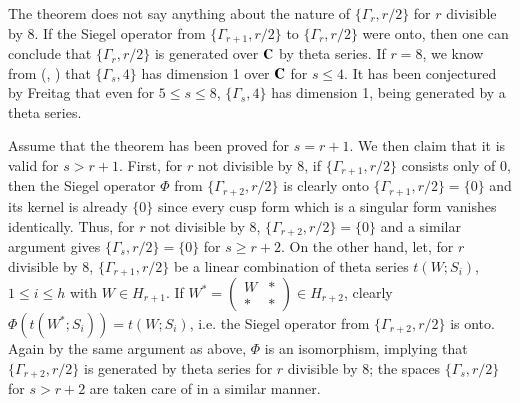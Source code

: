 \begin{remark*}
The theorem does not say anything about the nature of
$\{\Gamma_{r},r/2\}$ for $r$ divisible by $8$. If the Siegel operator
from $\{\Gamma_{r+1},r/2\}$ to $\{\Gamma_{r},r/2\}$ were onto, then
one can conclude that $\{\Gamma_{r},r/2\}$ is generated over $\mathbf{C}$ by
theta series. If $r=8$, we know from
(\cite{art02-key1}, \cite{art02-key2}) that $\{\Gamma_{s},4\}$ has
dimension 1 over $\mathbf{C}$ for $s\leq 4$. It has been conjectured by
Freitag that even for $5\leq s\leq 8$, $\{\Gamma_{s},4\}$ has
dimension 1, being generated by a theta series.
\end{remark*}

Assume that the theorem has been proved for $s=r+1$. We then claim
that it is valid for $s>r+1$. First, for $r$ not divisible by 8, if
$\{\Gamma_{r+1},r/2\}$ consists only of 0, then the Siegel operator
$\Phi$ from $\{\Gamma_{r+2},r/2\}$ is clearly onto
$\{\Gamma_{r+1},r/2\}=\{0\}$ and its kernel is already $\{0\}$ since
every cusp form which is a singular form vanishes identically. Thus,
for $r$ not divisible by 8, $\{\Gamma_{r+2},r/2\}=\{0\}$ and a similar
argument gives $\{\Gamma_{s},r/2\}=\{0\}$ for $s\geq r+2$. On the
other hand, let, for $r$ divisible by 8, $\{\Gamma_{r+1},r/2\}$ be a
linear combination of theta series $t(W;S_{i})$,\pageoriginale $1\leq
i\leq h$ with $W\in H_{r+1}$. If $W^{*}=\left(\begin{smallmatrix} W &
*\\ * & *\end{smallmatrix}\right)\in H_{r+2}$, clearly
$\Phi(t(W^{*};S_{i}))=t(W;S_{i})$, i.e. the Siegel operator from
$\{\Gamma_{r+2},r/2\}$ is onto. Again by the same argument as above,
$\Phi$ is an isomorphism, implying that $\{\Gamma_{r+2},r/2\}$ is
generated by theta series for $r$ divisible by 8; the spaces
$\{\Gamma_{s},r/2\}$ for $s>r+2$ are taken care of in a similar
manner.

